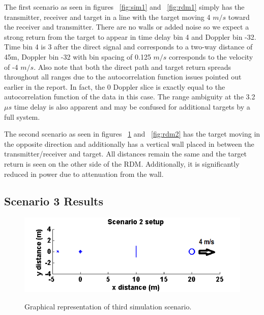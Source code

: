 \documentclass[article,11pt,onecolumn,final]{IEEEtran}
\begin{document}
The first scenario as seen in figures ~\ref{fig:sim1} and ~\ref{fig:rdm1} simply has the transmitter, receiver and target in a line with the target moving 4 $m/s$ toward the receiver and transmitter. There are no walls or added noise so we expect a strong return from the target to appear in time delay bin 4 and Doppler bin -32. Time bin 4 is 3 after the direct signal and corresponds to a two-way distance of 45m, Doppler bin -32 with bin spacing of 0.125 $m/s$ corresponds to the velocity of -4 $m/s$. Also note that both the direct path and target return spreads throughout all ranges due to the autocorrelation function issues pointed out earlier in the report. In fact, the 0 Doppler slice is exactly equal to the autocorrelation function of the data in this case. The range ambiguity at the 3.2 $\mu s$ time delay is also apparent and may be confused for additional targets by a full system.

The second scenario as seen in figures ~\ref{fig:sim2} and ~\ref{fig:rdm2} has the target moving in the opposite direction and additionally has a vertical wall placed in between the transmitter/receiver and target. All distances remain the same and the target return is seen on the other side of the RDM. Additionally, it is significantly reduced in power due to attenuation from the wall.

\subsection{Scenario 3 Results}

\begin{figure}[H]
	\caption{Graphical representation of third simulation scenario.}
	\centering
	\includegraphics[width=400pt]{figures/sim2.png}
	\label{fig:sim2}
\end{figure}
\end{document}
